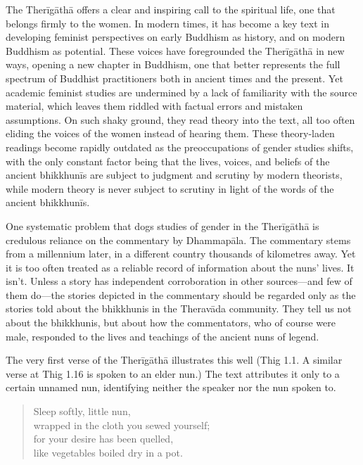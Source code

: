 \documentclass[12pt,openany]{book}%
\begin{document}
The \textsanskrit{Therīgāthā} offers a clear and inspiring call to the spiritual life, one that belongs firmly to the women. In modern times, it has become a key text in developing feminist perspectives on early Buddhism as history, and on modern Buddhism as potential. These voices have foregrounded the \textsanskrit{Therīgāthā} in new ways, opening a new chapter in Buddhism, one that better represents the full spectrum of Buddhist practitioners both in ancient times and the present. Yet academic feminist studies are undermined by a lack of familiarity with the source material, which leaves them riddled with factual errors and mistaken assumptions. On such shaky ground, they read theory into the text, all too often eliding the voices of the women instead of hearing them. These theory-laden readings become rapidly outdated as the preoccupations of gender studies shifts, with the only constant factor being that the lives, voices, and beliefs of the ancient \textsanskrit{bhikkhunīs} are subject to judgment and scrutiny by modern theorists, while modern theory is never subject to scrutiny in light of the words of the ancient \textsanskrit{bhikkhunīs}.

One systematic problem that dogs studies of gender in the \textsanskrit{Therīgāthā} is credulous reliance on the commentary by \textsanskrit{Dhammapāla}. The commentary stems from a millennium later, in a different country thousands of kilometres away. Yet it is too often treated as a reliable record of information about the nuns’ lives. It isn’t. Unless a story has independent corroboration in other sources—and few of them do—the stories depicted in the commentary should be regarded only as the stories told about the bhikkhunis in the \textsanskrit{Theravāda} community. They tell us not about the bhikkhunis, but about how the commentators, who of course were male, responded to the lives and teachings of the ancient nuns of legend.

The very first verse of the \textsanskrit{Therīgāthā} illustrates this well (Thig 1.1. A similar verse at Thig 1.16 is spoken to an elder nun.) The text attributes it only to a certain unnamed nun, identifying neither the speaker nor the nun spoken to.

\begin{quotation}%
Sleep softly, little nun, \\
wrapped in the cloth you sewed yourself; \\
for your desire has been quelled, \\
like vegetables boiled dry in a pot.

%
\end{quotation}
\end{document}
